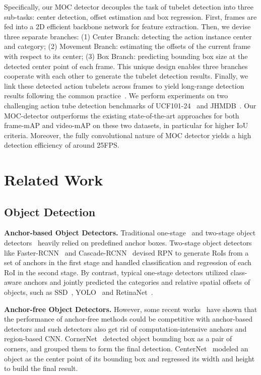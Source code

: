\documentclass[runningheads]{llncs}
\begin{document}
Specifically, our MOC detector decouples the task of tubelet detection into three sub-tasks: center detection, offset estimation and box regression. First, frames are fed into a 2D efficient backbone network for feature extraction. Then, we devise three separate branches: (1) Center Branch: detecting the action instance center and category; (2) Movement Branch: estimating the offsets of the current frame with respect to its center; (3) Box Branch: predicting bounding box size at the detected center point of each frame. This unique design enables three branches cooperate with each other to generate the tubelet detection results. Finally, we link these detected action tubelets across frames to yield long-range detection results following the common practice~\cite{kalogeiton2017action}. We perform experiments on two challenging action tube detection benchmarks of UCF101-24~\cite{UCF101} and JHMDB~\cite{JHMDB}. Our MOC-detector outperforms the existing state-of-the-art approaches for both frame-mAP and video-mAP on these two datasets, in particular for higher IoU criteria. Moreover, the fully convolutional nature of MOC detector yields a high detection efficiency of around 25FPS.

\section{Related Work}

\subsection{Object Detection}
\textbf{Anchor-based Object Detectors.}
Traditional one-stage~\cite{liu2016ssd,YOLOV1,lin2017focal} and two-stage object detectors~\cite{girshick2014rich,he2015spatial,girshick2015fast,ren2015faster} heavily relied on predefined anchor boxes. Two-stage object detectors like Faster-RCNN~\cite{ren2015faster}  and Cascade-RCNN~\cite{cai2018cascade} devised RPN to generate RoIs from a set of anchors in the first stage and handled classification and regression of each RoI in the second stage. By contrast, typical one-stage detectors utilized class-aware anchors and jointly predicted the categories and relative spatial offsets of objects, such as SSD~\cite{liu2016ssd}, YOLO~\cite{YOLOV1} and RetinaNet~\cite{lin2017focal}.

\textbf{Anchor-free Object Detectors.}
However, some recent works~\cite{FCOS,CenterNet,CornerNet,duan2019centernet,zhou2019bottom} have shown that the performance of anchor-free methods could be competitive with anchor-based detectors and such detectors also get rid of computation-intensive anchors and region-based CNN. CornerNet~\cite{CornerNet} detected object bounding box as a pair of corners, and grouped them to form the final detection. CenterNet~\cite{CenterNet} modeled an object as the center point of its bounding box and regressed its width and height to build the final
result.
\end{document}
